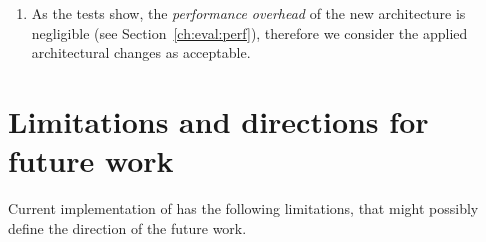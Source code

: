 \begin{enumerate}[label=\arabic*.]
\begin{enumerate}[leftmargin=\parindent,label=\alph*.]
  \end{enumerate}
  
\item 
As the tests show, the \textit{performance overhead} of the new architecture is negligible (see Section~\ref{ch:eval:perf}), therefore we consider the applied architectural changes as acceptable.

\end{enumerate}


\section{Limitations and directions for future work}

Current implementation of \porthos[2] has the following limitations, that might possibly define the direction of the future work.

